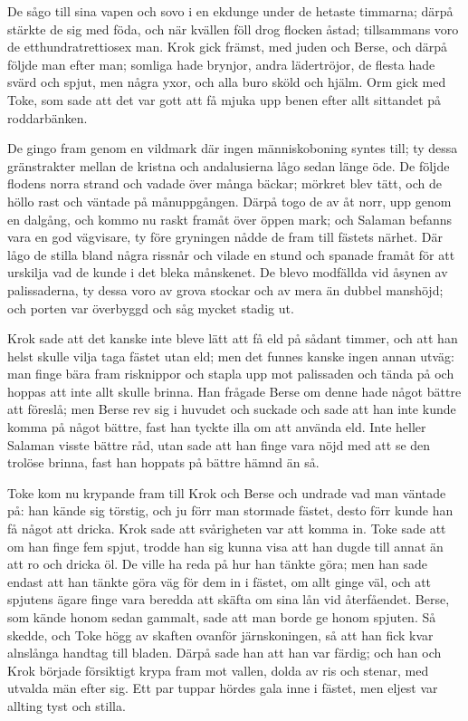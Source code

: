 \initial De sågo till sina vapen och sovo i en ekdunge under de hetaste timmarna; därpå stärkte de sig med föda, och när kvällen föll drog flocken åstad; tillsammans voro de etthundratrettiosex man. Krok gick främst, med juden och Berse, och därpå följde man efter man; somliga hade brynjor, andra lädertröjor, de flesta hade svärd och spjut, men några yxor, och alla buro sköld och hjälm. Orm gick med Toke, som sade att det var gott att få mjuka upp benen efter allt sittandet på roddarbänken.

\initial De gingo fram genom en vildmark där ingen människoboning syntes till; ty dessa gränstrakter mellan de kristna och andalusierna lågo sedan länge öde. De följde flodens norra strand och vadade över många bäckar; mörkret blev tätt, och de höllo rast och väntade på månuppgången. Därpå togo de av åt norr, upp genom en dalgång, och kommo nu raskt framåt över öppen mark; och Salaman befanns vara en god vägvisare, ty före gryningen nådde de fram till fästets närhet. Där lågo de stilla bland några rissnår och vilade en stund och spanade framåt för att urskilja vad de kunde i det bleka månskenet. De blevo modfällda vid åsynen av palissaderna, ty dessa voro av grova stockar och av mera än dubbel manshöjd; och porten var överbyggd och såg mycket stadig ut.

\initial Krok sade att det kanske inte bleve lätt att få eld på sådant timmer, och att han helst skulle vilja taga fästet utan eld; men det funnes kanske ingen annan utväg: man finge bära fram risknippor och stapla upp mot palissaden och tända på och hoppas att inte allt skulle brinna. Han frågade Berse om denne hade något bättre att föreslå; men Berse rev sig i huvudet och suckade och sade att han inte kunde komma på något bättre, fast han tyckte illa om att använda eld. Inte heller Salaman visste bättre råd, utan sade att han finge vara nöjd med att se den trolöse brinna, fast han hoppats på bättre hämnd än så.

\initial Toke kom nu krypande fram till Krok och Berse och undrade vad man väntade på: han kände sig törstig, och ju förr man stormade fästet, desto förr kunde han få något att dricka. Krok sade att svårigheten var att komma in. Toke sade att om han finge fem spjut, trodde han sig kunna visa att han dugde till annat än att ro och dricka öl. De ville ha reda på hur han tänkte göra; men han sade endast att han tänkte göra väg för dem in i fästet, om allt ginge väl, och att spjutens ägare finge vara beredda att skäfta om sina lån vid återfåendet. Berse, som kände honom sedan gammalt, sade att man borde ge honom spjuten. Så skedde, och Toke högg av skaften ovanför järnskoningen, så att han fick kvar alnslånga handtag till bladen. Därpå sade han att han var färdig; och han och Krok började försiktigt krypa fram mot vallen, dolda av ris och stenar, med utvalda män efter sig. Ett par tuppar hördes gala inne i fästet, men eljest var allting tyst och stilla.

